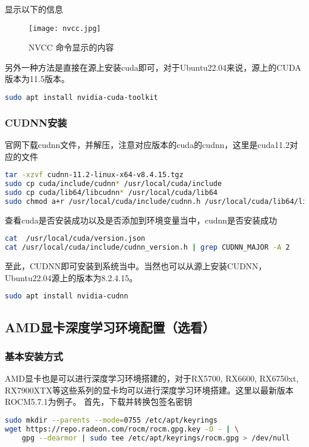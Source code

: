 \documentclass[lang=cn,a4paper,newtx]{elegantpaper}
\begin{document}
显示以下的信息

\begin{figure}[hbpt]
  \centering
  \texttt{[image: nvcc.jpg]}
  \caption{NVCC 命令显示的内容}
  \label{fig:ubuntu-nvcc}
\end{figure}

另外一种方法是直接在源上安装cuda即可，对于Ubuntu22.04来说，源上的CUDA版本为11.5版本。
\begin{lstlisting}[language=bash]
sudo apt install nvidia-cuda-toolkit
\end{lstlisting}

\subsubsection{CUDNN安装}
官网下载cudnn文件，并解压，注意对应版本的cuda的cudnn，这里是cuda11.2对应的文件
\begin{lstlisting}[language=bash]
tar -xzvf cudnn-11.2-linux-x64-v8.4.15.tgz
sudo cp cuda/include/cudnn* /usr/local/cuda/include
sudo cp cuda/lib64/libcudnn* /usr/local/cuda/lib64
sudo chmod a+r /usr/local/cuda/include/cudnn.h /usr/local/cuda/lib64/libcudnn*
\end{lstlisting}

查看cuda是否安装成功以及是否添加到环境变量当中，cudnn是否安装成功
\begin{lstlisting}[language=bash]
cat  /usr/local/cuda/version.json
cat /usr/local/cuda/include/cudnn_version.h | grep CUDNN_MAJOR -A 2
\end{lstlisting}

至此，CUDNN即可安装到系统当中。当然也可以从源上安装CUDNN，Ubuntu22.04源上的版本为8.2.4.15。
\begin{lstlisting}[language=bash]
sudo apt install nvidia-cudnn
\end{lstlisting}

\subsection{AMD显卡深度学习环境配置（选看）}
\subsubsection{基本安装方式}
AMD显卡也是可以进行深度学习环境搭建的，对于RX5700, RX6600, RX6750xt, RX7900XTX等这些系列的显卡均可以进行深度学习环境搭建。这里以最新版本ROCM5.7.1为例子。
首先，下载并转换包签名密钥
\begin{lstlisting}[language=bash]
sudo mkdir --parents --mode=0755 /etc/apt/keyrings
wget https://repo.radeon.com/rocm/rocm.gpg.key -O - | \
    gpg --dearmor | sudo tee /etc/apt/keyrings/rocm.gpg > /dev/null
\end{lstlisting}
\end{document}
